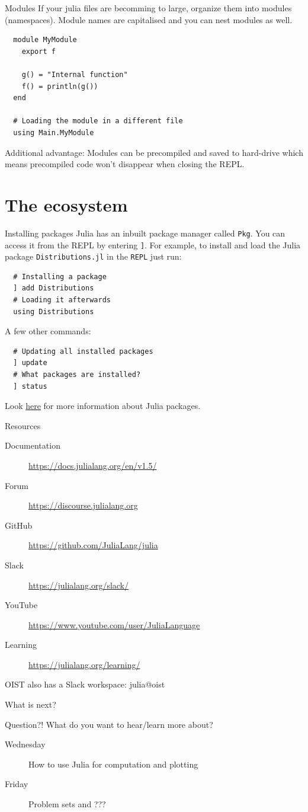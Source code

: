 \documentclass{beamer}
\begin{document}
\begin{frame}[fragile]{Modules}
If your julia files are becomming to large, organize them into modules (namespaces). Module names are capitalised and you can nest modules as well.

  \begin{lstlisting}
  module MyModule
    export f

    g() = "Internal function"
    f() = println(g())
  end
  
  # Loading the module in a different file
  using Main.MyModule
  \end{lstlisting}
Additional advantage: Modules can be precompiled and saved to hard-drive which means precompiled code won't disappear when closing the REPL.
\end{frame}


\section{The ecosystem}
\begin{frame}[fragile]{Installing packages}
  Julia has an inbuilt package manager called \verb|Pkg|. You can access it from the REPL by entering \verb|]|.
  For example, to install and load the Julia package \verb|Distributions.jl| in the \verb|REPL| just run:

  \begin{lstlisting}
  # Installing a package
  ] add Distributions
  # Loading it afterwards
  using Distributions
  \end{lstlisting}

  A few other commands:
  \begin{lstlisting}
  # Updating all installed packages
  ] update
  # What packages are installed?
  ] status
  \end{lstlisting}
  Look \href{https://julialang.org/packages/}{\color{blue} here} for more information about Julia packages.
\end{frame}
\begin{frame}{Resources}
\begin{description}
	\item[Documentation] \url{https://docs.julialang.org/en/v1.5/}
	\item[Forum] \url{https://discourse.julialang.org}
	\item[GitHub] \url{https://github.com/JuliaLang/julia}
	\item[Slack] \url{https://julialang.org/slack/}
	\item[YouTube] \url{https://www.youtube.com/user/JuliaLanguage}
	\item[Learning] \url{https://julialang.org/learning/}
\end{description}
\vfill
OIST also has a Slack workspace: julia@oist
\end{frame}
\begin{frame}{What is next?}
  \begin{block}{Question?!}
    What do you want to hear/learn more about?
  \end{block}
  \begin{description}
    \item[Wednesday] How to use Julia for computation and plotting
    \item[Friday] Problem sets and ???
  \end{description}
\end{frame}
\end{document}
